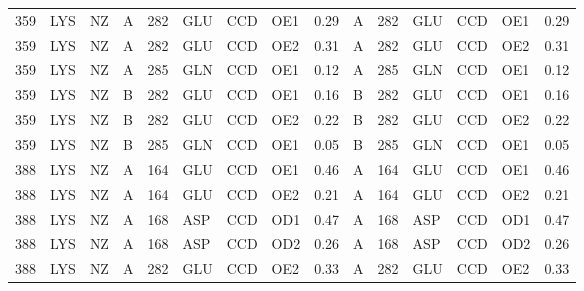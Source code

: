 \begin{longtable}{rlllrlllrlrlllr}
       359 & LYS        & NZ     & A         &         282 & GLU          & CCD         & OE1      &          0.29 & A         &         282 & GLU          & CCD         & OE1      &          0.29 \\
       359 & LYS        & NZ     & A         &         282 & GLU          & CCD         & OE2      &          0.31 & A         &         282 & GLU          & CCD         & OE2      &          0.31 \\
       359 & LYS        & NZ     & A         &         285 & GLN          & CCD         & OE1      &          0.12 & A         &         285 & GLN          & CCD         & OE1      &          0.12 \\
       359 & LYS        & NZ     & B         &         282 & GLU          & CCD         & OE1      &          0.16 & B         &         282 & GLU          & CCD         & OE1      &          0.16 \\
       359 & LYS        & NZ     & B         &         282 & GLU          & CCD         & OE2      &          0.22 & B         &         282 & GLU          & CCD         & OE2      &          0.22 \\
       359 & LYS        & NZ     & B         &         285 & GLN          & CCD         & OE1      &          0.05 & B         &         285 & GLN          & CCD         & OE1      &          0.05 \\
       388 & LYS        & NZ     & A         &         164 & GLU          & CCD         & OE1      &          0.46 & A         &         164 & GLU          & CCD         & OE1      &          0.46 \\
       388 & LYS        & NZ     & A         &         164 & GLU          & CCD         & OE2      &          0.21 & A         &         164 & GLU          & CCD         & OE2      &          0.21 \\
       388 & LYS        & NZ     & A         &         168 & ASP          & CCD         & OD1      &          0.47 & A         &         168 & ASP          & CCD         & OD1      &          0.47 \\
       388 & LYS        & NZ     & A         &         168 & ASP          & CCD         & OD2      &          0.26 & A         &         168 & ASP          & CCD         & OD2      &          0.26 \\
       388 & LYS        & NZ     & A         &         282 & GLU          & CCD         & OE2      &          0.33 & A         &         282 & GLU          & CCD         & OE2      &          0.33 \\

\end{longtable}
